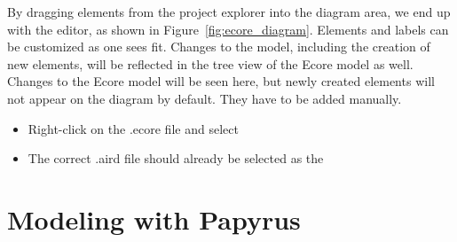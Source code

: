 By dragging elements from the project explorer into the diagram area, we end up with the editor, as shown in Figure~\ref{fig:ecore_diagram}.  Elements and labels can be customized as one sees fit.  Changes to the model, including the creation of new elements, will be reflected in the tree view of the Ecore model as well.  Changes to the Ecore model will be seen here, but newly created elements will not appear on the diagram by default.  They have to be added manually.

\begin{itemize}
\item Right-click on the .ecore file and select 
\item The correct .aird file should already be selected as the 
\end{itemize}

\section{Modeling with Papyrus}


